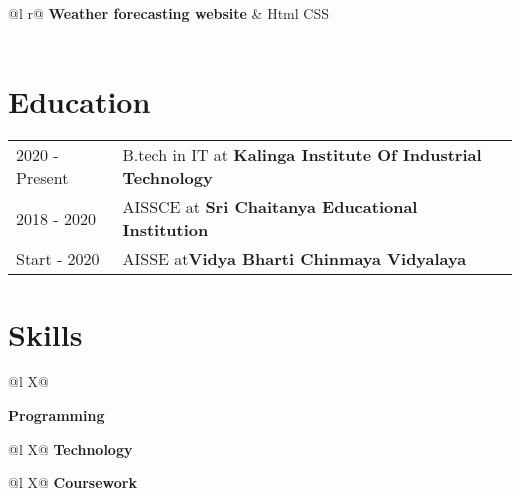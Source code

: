 \documentclass[a4paper,12pt]{article}
\begin{document}
\begin{tabularx}{\linewidth}{ @{}l r@{} }
\textbf{Weather forecasting website} & \hfill {Html CSS} \\[3.75pt]
  \\
\end{tabularx}
\section{Education}
\begin{tabularx}{\linewidth}{@{}l X@{}}	
2020 - Present & B.tech in IT at \textbf{Kalinga Institute Of Industrial Technology}  \\

2018 - 2020 & AISSCE at \textbf{Sri Chaitanya Educational Institution}\\ 

Start - 2020 & AISSE at\textbf{Vidya Bharti Chinmaya Vidyalaya}  \\
\end{tabularx}



\section{Skills}
\begin{tabularx}{\linewidth}{@{}l X@{}}

\textbf{Programming}\\[3.75pt]
\end{tabularx}
\begin{tabularx}{\linewidth}{@{}l X@{}}
\textbf{Technology}\\[3.75pt]
\end{tabularx}
\begin{tabularx}{\linewidth}{@{}l X@{}}
\textbf{Coursework}\\[3.75pt]
\end{tabularx}

\vfill
\end{document}
